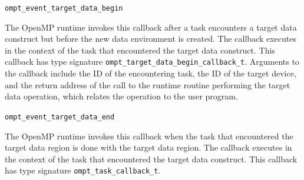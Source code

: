 \documentclass{article}
\newcommand{\descheader}[1]{{\needspace{3\baselineskip}\vspace{1em}\noindent \fbox{#1}}}
\begin{document}
\descheader{Target Devices}

\begin{description}

\item \verb|ompt_event_target_data_begin|

  The OpenMP runtime invokes this callback after a task encounters a target data construct but before the new data environment is created.
  The callback executes in the context of the task that encountered the target data construct. 
  This callback has type signature \verb|ompt_target_data_begin_callback_t|. Arguments to the callback include the ID of the encountering task, the ID of the 
  target device, and the return address of the call to the runtime routine performing the target data operation, which relates the operation to 
  the user program. 
  
\item \verb|ompt_event_target_data_end|

  The OpenMP runtime invokes this callback when the task that encountered the target data region is 
  done with the target data region. 
  The callback executes in the context of the task that encountered the target data construct.
  This callback has type signature \verb|ompt_task_callback_t|.

\end{description}
\end{document}
